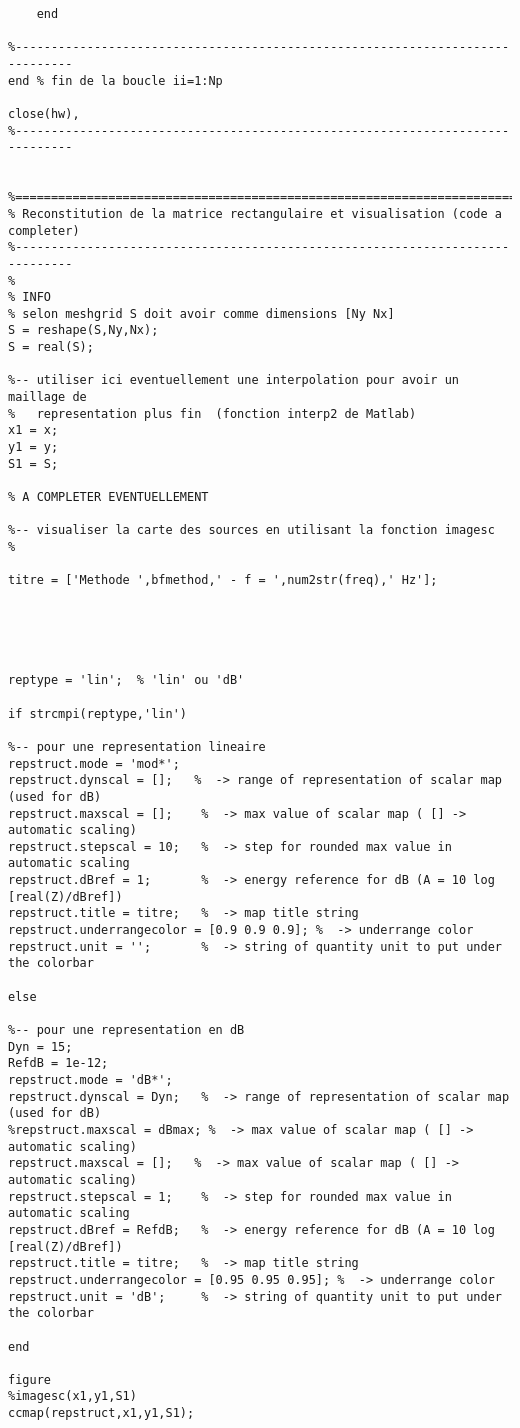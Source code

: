 \begin{verbatim}
    end    
    
%------------------------------------------------------------------------------
end % fin de la boucle ii=1:Np

close(hw),
%------------------------------------------------------------------------------


%==============================================================================
% Reconstitution de la matrice rectangulaire et visualisation (code a completer) 
%------------------------------------------------------------------------------
%
% INFO
% selon meshgrid S doit avoir comme dimensions [Ny Nx]
S = reshape(S,Ny,Nx);
S = real(S);

%-- utiliser ici eventuellement une interpolation pour avoir un maillage de 
%   representation plus fin  (fonction interp2 de Matlab)
x1 = x;
y1 = y;
S1 = S;

% A COMPLETER EVENTUELLEMENT

%-- visualiser la carte des sources en utilisant la fonction imagesc
%

titre = ['Methode ',bfmethod,' - f = ',num2str(freq),' Hz'];





reptype = 'lin';  % 'lin' ou 'dB'

if strcmpi(reptype,'lin')
    
%-- pour une representation lineaire
repstruct.mode = 'mod*';
repstruct.dynscal = [];   %  -> range of representation of scalar map (used for dB)
repstruct.maxscal = [];    %  -> max value of scalar map ( [] -> automatic scaling)
repstruct.stepscal = 10;   %  -> step for rounded max value in automatic scaling
repstruct.dBref = 1;       %  -> energy reference for dB (A = 10 log [real(Z)/dBref])
repstruct.title = titre;   %  -> map title string
repstruct.underrangecolor = [0.9 0.9 0.9]; %  -> underrange color
repstruct.unit = '';       %  -> string of quantity unit to put under the colorbar

else
    
%-- pour une representation en dB
Dyn = 15;
RefdB = 1e-12;
repstruct.mode = 'dB*';
repstruct.dynscal = Dyn;   %  -> range of representation of scalar map (used for dB)
%repstruct.maxscal = dBmax; %  -> max value of scalar map ( [] -> automatic scaling)
repstruct.maxscal = [];   %  -> max value of scalar map ( [] -> automatic scaling)
repstruct.stepscal = 1;    %  -> step for rounded max value in automatic scaling
repstruct.dBref = RefdB;   %  -> energy reference for dB (A = 10 log [real(Z)/dBref])
repstruct.title = titre;   %  -> map title string
repstruct.underrangecolor = [0.95 0.95 0.95]; %  -> underrange color
repstruct.unit = 'dB';     %  -> string of quantity unit to put under the colorbar

end

figure
%imagesc(x1,y1,S1)
ccmap(repstruct,x1,y1,S1);



\end{verbatim}

